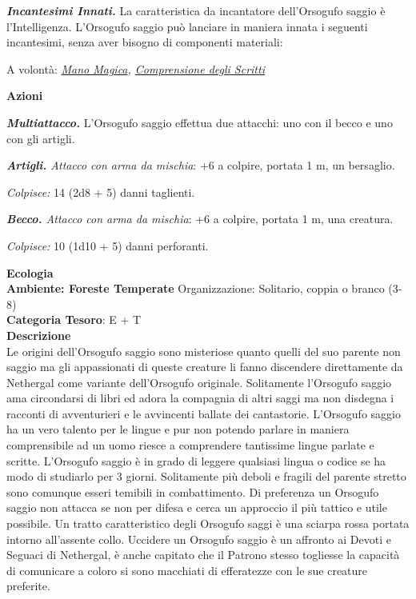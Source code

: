\begin{multicols}{2}
{\emph{\textbf{Incantesimi Innati.}} La caratteristica da incantatore dell'Orsogufo saggio è l'Intelligenza. L'Orsogufo saggio può lanciare in maniera innata i seguenti incantesimi, senza aver bisogno di componenti materiali:

A volontà: \emph{\hyperlink{Mano Magica}{Mano Magica}, \hyperlink{Comprensione degli Scritti}{Comprensione degli Scritti}}

\textbf{Azioni}

\emph{\textbf{Multiattacco.}} L'Orsogufo saggio effettua due attacchi: uno con il becco e uno con gli artigli.

\emph{\textbf{Artigli.} Attacco con arma da mischia}: +6 a colpire, portata 1 m, un bersaglio.

\emph{Colpisce:} 14 (2d8 + 5) danni taglienti.

\emph{\textbf{Becco.} Attacco con arma da mischia}: +6 a colpire, portata 1 m, una creatura.

\emph{Colpisce:} 10 (1d10 + 5) danni perforanti.

\textbf{Ecologia}\\
\textbf{Ambiente: Foreste Temperate}
Organizzazione: Solitario, coppia o branco (3-8)\\
\textbf{Categoria Tesoro}: E + T\\
\textbf{Descrizione}\\
Le origini dell'Orsogufo saggio sono misteriose quanto quelli del suo parente non saggio ma gli appassionati di queste creature li fanno discendere direttamente da Nethergal come variante dell'Orsogufo originale.
Solitamente l'Orsogufo saggio ama circondarsi di libri ed adora la compagnia di altri saggi ma non disdegna i racconti di avventurieri e le avvincenti ballate dei cantastorie. L'Orsogufo saggio ha un vero talento per le lingue e pur non potendo parlare in maniera comprensibile ad un uomo riesce a comprendere tantissime lingue parlate e scritte. L'Orsogufo saggio è in grado di leggere qualsiasi lingua o codice se ha modo di studiarlo per 3 giorni.
Solitamente più deboli e fragili del parente stretto sono comunque esseri temibili in combattimento.
Di preferenza un Orsogufo saggio non attacca se non per difesa e cerca un approccio il più tattico e utile possibile. Un tratto caratteristico degli Orsogufo saggi è una sciarpa rossa portata intorno all'assente collo. Uccidere un Orsogufo saggio è un affronto ai Devoti e Seguaci di Nethergal, è anche capitato che il Patrono stesso togliesse la capacità di comunicare a coloro si sono macchiati di efferatezze con le sue creature preferite.

}
\end{multicols}
